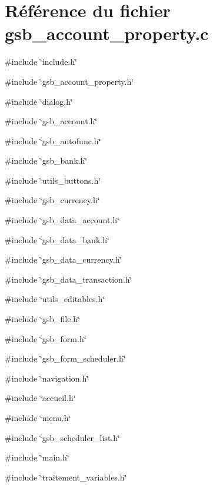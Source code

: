\section{Référence du fichier gsb\_\-account\_\-property.c}
\label{gsb__account__property_8c}
{\ttfamily \#include \char`\"{}include.h\char`\"{}}\par
{\ttfamily \#include \char`\"{}gsb\_\-account\_\-property.h\char`\"{}}\par
{\ttfamily \#include \char`\"{}dialog.h\char`\"{}}\par
{\ttfamily \#include \char`\"{}gsb\_\-account.h\char`\"{}}\par
{\ttfamily \#include \char`\"{}gsb\_\-autofunc.h\char`\"{}}\par
{\ttfamily \#include \char`\"{}gsb\_\-bank.h\char`\"{}}\par
{\ttfamily \#include \char`\"{}utils\_\-buttons.h\char`\"{}}\par
{\ttfamily \#include \char`\"{}gsb\_\-currency.h\char`\"{}}\par
{\ttfamily \#include \char`\"{}gsb\_\-data\_\-account.h\char`\"{}}\par
{\ttfamily \#include \char`\"{}gsb\_\-data\_\-bank.h\char`\"{}}\par
{\ttfamily \#include \char`\"{}gsb\_\-data\_\-currency.h\char`\"{}}\par
{\ttfamily \#include \char`\"{}gsb\_\-data\_\-transaction.h\char`\"{}}\par
{\ttfamily \#include \char`\"{}utils\_\-editables.h\char`\"{}}\par
{\ttfamily \#include \char`\"{}gsb\_\-file.h\char`\"{}}\par
{\ttfamily \#include \char`\"{}gsb\_\-form.h\char`\"{}}\par
{\ttfamily \#include \char`\"{}gsb\_\-form\_\-scheduler.h\char`\"{}}\par
{\ttfamily \#include \char`\"{}navigation.h\char`\"{}}\par
{\ttfamily \#include \char`\"{}accueil.h\char`\"{}}\par
{\ttfamily \#include \char`\"{}menu.h\char`\"{}}\par
{\ttfamily \#include \char`\"{}gsb\_\-scheduler\_\-list.h\char`\"{}}\par
{\ttfamily \#include \char`\"{}main.h\char`\"{}}\par
{\ttfamily \#include \char`\"{}traitement\_\-variables.h\char`\"{}}\par
